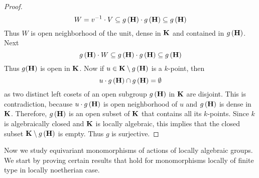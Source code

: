 \begin{proof}
$$W = v^{-1}\cdot V \subseteq g\left(\mathbf{H}\right)\cdot g\left(\mathbf{H}\right) \subseteq g\left(\mathbf{H}\right)$$
Thus $W$ is open neighborhood of the unit, dense in $\mathbf{K}$ and contained in $g\left(\mathbf{H}\right)$. Next
$$g\left(\mathbf{H}\right)\cdot W \subseteq g\left(\mathbf{H}\right)\cdot g\left(\mathbf{H}\right)\subseteq g\left(\mathbf{H}\right)$$
Thus $g(\mathbf{H})$ is open in $\mathbf{K}$. Now if $u\in \mathbf{K}\setminus g\left(\mathbf{H}\right)$ is a $k$-point, then
$$u\cdot g\left(\mathbf{H}\right)\cap g\left(\mathbf{H}\right) = \emptyset$$
as two distinct left cosets of an open subgroup $g\left(\mathbf{H}\right)$ in $\mathbf{K}$ are disjoint. This is contradiction, because $u\cdot g\left(\mathbf{H}\right)$ is open neighborhood of $u$ and $g\left(\mathbf{H}\right)$ is dense in $\mathbf{K}$. Therefore, $g\left(\mathbf{H}\right)$ is an open subset of $\mathbf{K}$ that contains all its $k$-points. Since $k$ is algebraically closed and $\mathbf{K}$ is locally algebraic, this implies that the closed subset $\mathbf{K}\setminus g\left(\mathbf{H}\right)$ is empty. Thus $g$ is surjective.
\end{proof}
\noindent
Now we study equivariant monomorphisms of actions of locally algebraic groups. We start by proving certain results that hold for monomorphisms locally of finite type in locally noetherian case.

